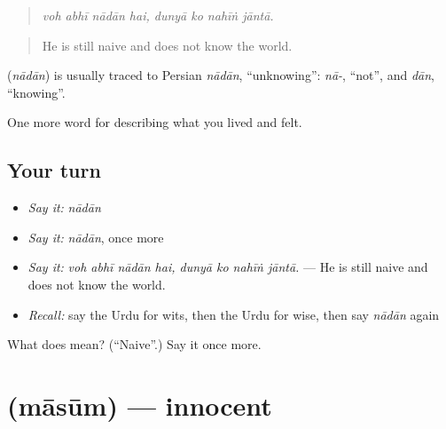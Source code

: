 \begin{quote}
       
\end{quote}

\begin{quote}
\emph{voh abhī nādān hai, dunyā ko nahīṅ jāntā.}
\end{quote}

\begin{quote}
He is still naive and does not know the world.
\end{quote}

\begin{cousinweb}
\textbf{} (\emph{nādān}) is usually traced to Persian \emph{nādān}, \textquotedblleft{}unknowing\textquotedblright{}: \emph{nā-}, \textquotedblleft{}not\textquotedblright{}, and \emph{dān}, \textquotedblleft{}knowing\textquotedblright{}.
\end{cousinweb}

\begin{grammarlens}[title={What you've built}]
One more word for describing what you lived and felt.
\end{grammarlens}

\subsection*{Your turn}
\begin{itemize}
\raggedright
  \item \emph{Say it:} \emph{nādān}
  \item \emph{Say it:} \emph{nādān}, once more
  \item \emph{Say it:} \emph{voh abhī nādān hai, dunyā ko nahīṅ jāntā.} — He is still naive and does not know the world.
  \item \emph{Recall:} say the Urdu for wits, then the Urdu for wise, then say \emph{nādān} again
\end{itemize}

\begin{tcolorbox}[breakable,colback=teal!4,colframe=teal!35!black,title={Before you move on}]
What does  mean? (\textquotedblleft{}Naive\textquotedblright{}.) Say it once more.
\end{tcolorbox}
\section[\texorpdfstring{\ur{معصوم} (māsūm)}{معصوم (māsūm)}]{ (māsūm) — innocent}

